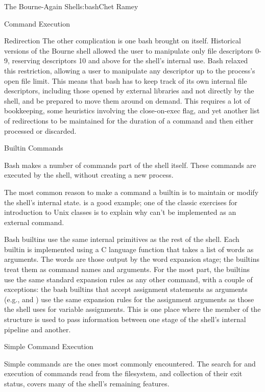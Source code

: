 \begin{aosachapter}{The Bourne-Again Shell}{s:bash}{Chet Ramey}
\begin{aosasect1}{Command Execution}
\begin{aosasect2}{Redirection}
The other complication is one bash brought on itself.  Historical
versions of the Bourne shell allowed the user to manipulate only file
descriptors 0-9, reserving descriptors 10 and above for the shell's
internal use.  Bash relaxed this restriction, allowing a user to
manipulate any descriptor up to the process's open file limit.  This
means that bash has to keep track of its own internal file
descriptors, including those opened by external libraries and not
directly by the shell, and be prepared to move them around on demand.
This requires a lot of bookkeeping, some heuristics involving the
close-on-exec flag, and yet another list of redirections to be
maintained for the duration of a command and then either processed or
discarded.

\end{aosasect2}

\begin{aosasect2}{Builtin Commands}

Bash makes a number of commands part of the shell itself.  These
commands are executed by the shell, without creating a new process.

The most common reason to make a command a builtin is to maintain or
modify the shell's internal state.   is a good example; one
of the classic exercises for introduction to Unix classes is to
explain why  can't be implemented as an external command.

Bash builtins use the same internal primitives as the rest of the
shell.  Each builtin is implemented using a C language function that
takes a list of words as arguments.  The words are those output by the
word expansion stage; the builtins treat them as command names and
arguments.  For the most part, the builtins use the same standard
expansion rules as any other command, with a couple of exceptions: the
bash builtins that accept assignment statements as arguments (e.g.,
 and ) use the same expansion rules for the
assignment arguments as those the shell uses for variable assignments.
This is one place where the  member of the
 structure is used to pass information between one
stage of the shell's internal pipeline and another.

\end{aosasect2}

\begin{aosasect2}{Simple Command Execution}

Simple commands are the ones most commonly encountered.  The search
for and execution of commands read from the filesystem, and
collection of their exit status, covers many of the shell's remaining
features.


\end{aosasect2}
\end{aosasect1}
\end{aosachapter}
